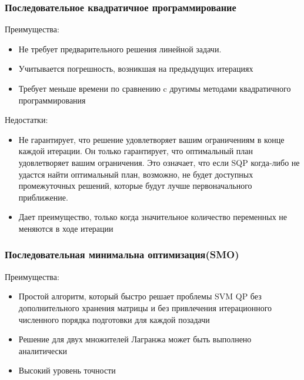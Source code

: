 \documentclass[main.tex]{subfiles}
\begin{document}
\subsubsection{Последовательное квадратичное программирование}
Преимущества:
\begin{itemize}
	\item Не требует предварительного решения линейной задачи.
	\item Учитывается погрешность, возникшая на предыдущих
	итерациях
	\item Требует меньше времени по сравнению c другимы методами квадратичного программирования
\end{itemize}
	

Недостатки:
\begin{itemize}
	\item Не гарантирует, что решение удовлетворяет вашим ограничениям в конце каждой итерации. Он только гарантирует, что оптимальный план удовлетворяет вашим ограничения. Это означает, что если SQP когда-либо не удастся найти оптимальный план, возможно, не будет доступных промежуточных решений, которые будут лучше первоначального приближение.
	\item Дает преимущество, только когда значительное количество
	переменных не меняются в ходе итерации

\end{itemize}

\subsubsection{Последовательная минимальна оптимизация(SMO)}
Преимущества:
\begin{itemize}
	\item Простой алгоритм, который быстро решает проблемы SVM QP без дополнительного хранения матрицы и без привлечения итерационного численного порядка подготовки для каждой позадачи
	\item Решение для двух множителей Лагранжа может быть выполнено
	аналитически
	\item Высокий уровень точности
\end{itemize}
	
\end{document}
